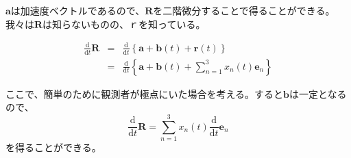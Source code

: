 \documentclass[twocolumn,a4j,10pt]{jarticle}
\begin{document}
$\bm{a}$は加速度ベクトルであるので、$\bm{R}$を二階微分することで得ることができる。我々は$\bm{R}$は知らないものの、$\bm{ｒ}$を知っている。

\begin{eqnarray}
  \frac{\mathrm{d}}{\mathrm{d} t} \bm{R} &=& \frac{\mathrm{d}}{\mathrm{d} t} \left\{ \bm{a} + \bm{b}(t) + \bm{r}(t) \right\} \nonumber \\
　&=& \frac{\mathrm{d}}{\mathrm{d} t} \left\{ \bm{a} + \bm{b}(t) + \sum_{n=1}^{3}x_n (t) \bm{e}_n \right\} \nonumber
\end{eqnarray}

ここで、簡単のために観測者が極点にいた場合を考える。すると$\bm{b}$は一定となるので、
\begin{equation}
  \frac{\mathrm{d}}{\mathrm{d} t} \bm{R} = \sum_{n=1}^{3}x_n (t) \frac{\mathrm{d}}{\mathrm{d} t} \bm{e}_n
  \label{deｆｆ_of_R}
\end{equation}
を得ることができる。
\end{document}
